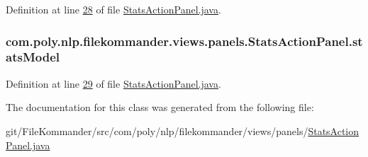 Definition at line \hyperlink{L28}{28} of file \hyperlink{}{Stats\-Action\-Panel.\-java}.

\hypertarget{classcom_1_1poly_1_1nlp_1_1filekommander_1_1views_1_1panels_1_1_stats_action_panel_aaefc874fb6203949c9a759791eaf06b3}{
\subsubsection[{stats\-Model}]{ com.\-poly.\-nlp.\-filekommander.\-views.\-panels.\-Stats\-Action\-Panel.\-stats\-Model\hspace{0.3cm}{\ttfamily [private]}}}\label{classcom_1_1poly_1_1nlp_1_1filekommander_1_1views_1_1panels_1_1_stats_action_panel_aaefc874fb6203949c9a759791eaf06b3}


Definition at line \hyperlink{L29}{29} of file \hyperlink{}{Stats\-Action\-Panel.\-java}.



The documentation for this class was generated from the following file\-:\begin{DoxyCompactItemize}
\item 
git/\-File\-Kommander/src/com/poly/nlp/filekommander/views/panels/\hyperlink{_stats_action_panel_8java}{Stats\-Action\-Panel.\-java}\end{DoxyCompactItemize}
